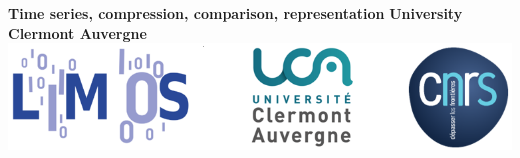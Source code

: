 \hrulefill%
{\Large \textbf{Time series, compression, comparison, representation}}
\hrulefill%
\hrulefill
{\Large \textbf{University Clermont Auvergne} }
\hfill\includegraphics[scale=0.5]{./images/logoLimos.png} 
\hrulefill